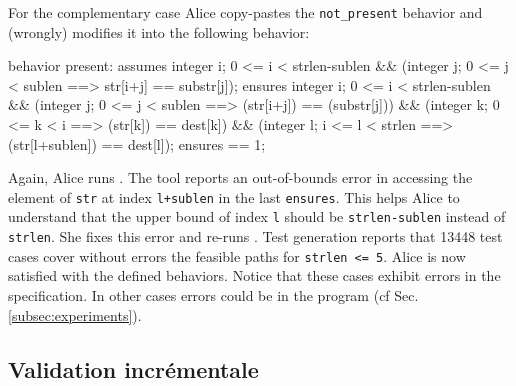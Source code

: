 For the complementary case Alice copy-pastes the \lstinline{not_present}
behavior and (wrongly) modifies it into the following behavior:
\begin{pretty-codeACSL}
behavior present:
 assumes \exists integer i; 0 <= i < strlen-sublen && 
  (\forall integer j; 0 <= j < sublen ==> str[i+j] == substr[j]);
 ensures \exists integer i; 0 <= i < strlen-sublen &&
  (\forall integer j; 0 <= j < sublen ==> \old(str[i+j]) == \old(substr[j])) &&
  (\forall integer k; 0 <= k < i ==> \old(str[k]) == dest[k]) &&
  (\forall integer l; i <= l < strlen ==> \old(str[l+sublen]) == dest[l]);
 ensures \result == 1;
\end{pretty-codeACSL}
Again, Alice runs \stady.
The tool reports an out-of-bounds error in accessing the element 
of \lstinline{str} at index \lstinline{l+sublen}
in the last \lstinline{ensures}. This helps Alice to understand that the upper
bound of index \lstinline'l' should be \lstinline{strlen-sublen} instead of \lstinline{strlen}.
She fixes this error and re-runs \stady. Test generation reports that 13448
test cases cover without errors the feasible paths for
\lstinline{strlen <= 5}. Alice is now satisfied with the defined behaviors.
Notice that these cases exhibit errors in the specification. In other
cases errors could be in the program (cf Sec.\,\ref{subsec:experiments}).


\subsection{Validation incrémentale}
\label{sec:ncd-incr}


